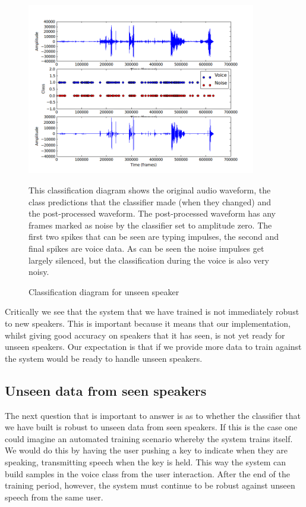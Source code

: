 \documentclass[ %
                    author={Sam Phippen},
                supervisor={Dr. Rafal Bogacz},
                     title={Real time voice activity detectors in noisy personal computing environments},
                  subtitle={},
                    degree={MEng},
                      year={2012} ]{thesis}
\begin{document}
\begin{figure}
    \begin{center}

        \includegraphics[width=10cm]{peter.png}
    \end{center}

    This classification diagram shows the original audio waveform, the class
    predictions that the classifier made (when they changed) and the
    post-processed waveform. The post-processed waveform has any frames marked
    as noise by the classifier set to amplitude zero. The first two spikes that
    can be seen are typing impulses, the second and final spikes are voice
    data. As can be seen the noise impulses get largely silenced, but the
    classification during the voice is also very noisy.

    \caption{Classification diagram for unseen speaker}
    \label{fig:waveform_unseen}

\end{figure}

Critically we see that the system that we have trained is not immediately
robust to new speakers. This is important because it means that our
implementation, whilst giving good accuracy on speakers that it has seen, is
not yet ready for unseen speakers. Our expectation is that if we provide more
data to train against the system would be ready to handle unseen speakers.

\subsection{Unseen data from seen speakers}

The next question that is important to answer is as to whether the classifier
that we have built is robust to unseen data from seen speakers. If this is the
case one could imagine an automated training scenario whereby the system trains
itself. We would do this by having the user pushing a key to indicate when they
are speaking, transmitting speech when the key is held. This way the system can
build samples in the voice class from the user interaction. After the end of
the training period, however, the system must continue to be robust against
unseen speech from the same user.
\end{document}
